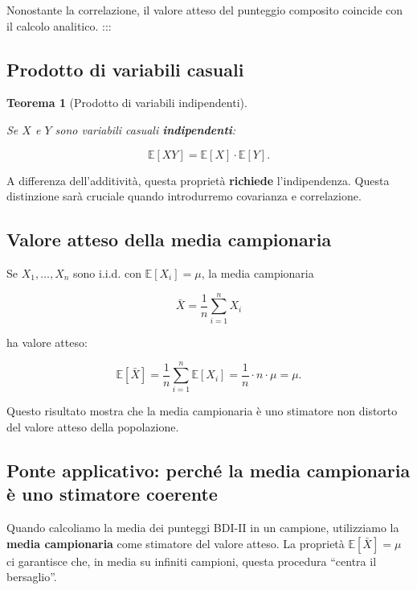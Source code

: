 \documentclass[
  italian,
  letterpaper,
  a4paper,
  11pt,
  open=any]{scrbook}
\theoremstyle{plain}
\newtheorem{theorem}{Teorema}[chapter]
\theoremstyle{definition}
\theoremstyle{definition}
\theoremstyle{remark}
\begin{document}
Nonostante la correlazione, il valore atteso del punteggio composito
coincide con il calcolo analitico. :::

\subsection{Prodotto di variabili
casuali}\label{prodotto-di-variabili-casuali}

\begin{theorem}[Prodotto di variabili
indipendenti]\protect\hypertarget{thm-expected-value-product}{}\label{thm-expected-value-product}

Se \(X\) e \(Y\) sono variabili casuali \textbf{indipendenti}:

\[
\mathbb{E}[XY] = \mathbb{E}[X]\cdot \mathbb{E}[Y].
\]

\end{theorem}

A differenza dell'additività, questa proprietà \textbf{richiede}
l'indipendenza. Questa distinzione sarà cruciale quando introdurremo
covarianza e correlazione.

\subsection{Valore atteso della media
campionaria}\label{valore-atteso-della-media-campionaria}

Se \(X_1, \ldots, X_n\) sono i.i.d. con \(\mathbb{E}[X_i] = \mu\), la
media campionaria

\[
\bar{X} = \frac{1}{n}\sum_{i=1}^{n} X_i
\]

ha valore atteso:

\[
\mathbb{E}[\bar{X}] = \frac{1}{n}\sum_{i=1}^{n} \mathbb{E}[X_i] = \frac{1}{n} \cdot n \cdot \mu = \mu.
\]

Questo risultato mostra che la media campionaria è uno stimatore non
distorto del valore atteso della popolazione.

\subsection{Ponte applicativo: perché la media campionaria è uno
stimatore
coerente}\label{ponte-applicativo-perchuxe9-la-media-campionaria-uxe8-uno-stimatore-coerente}

Quando calcoliamo la media dei punteggi BDI-II in un campione,
utilizziamo la \textbf{media campionaria} come stimatore del valore
atteso. La proprietà \(\mathbb{E}[\bar{X}] = \mu\) ci garantisce che, in
media su infiniti campioni, questa procedura ``centra il bersaglio''.
\end{document}
